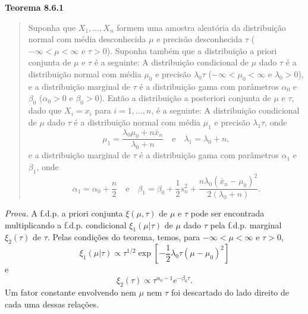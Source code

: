 \vspace{1em}
\noindent\textbf{Teorema 8.6.1}
\begin{quote}
    Suponha que $X_1, \dots, X_n$ formem uma amostra aleatória da distribuição normal com média desconhecida $\mu$ e precisão desconhecida $\tau$ ($-\infty < \mu < \infty$ e $\tau > 0$). Suponha também que a distribuição a priori conjunta de $\mu$ e $\tau$ é a seguinte: A distribuição condicional de $\mu$ dado $\tau$ é a distribuição normal com média $\mu_0$ e precisão $\lambda_0\tau$ ($-\infty < \mu_0 < \infty$ e $\lambda_0 > 0$), e a distribuição marginal de $\tau$ é a distribuição gama com parâmetros $\alpha_0$ e $\beta_0$ ($\alpha_0 > 0$ e $\beta_0 > 0$). Então a distribuição a posteriori conjunta de $\mu$ e $\tau$, dado que $X_i = x_i$ para $i=1, \dots, n$, é a seguinte: A distribuição condicional de $\mu$ dado $\tau$ é a distribuição normal com média $\mu_1$ e precisão $\lambda_1\tau$, onde
    \begin{equation} \label{eq:8.6.1}
        \mu_1 = \frac{\lambda_0\mu_0 + n\bar{x}_n}{\lambda_0 + n} \quad \text{e} \quad \lambda_1 = \lambda_0 + n,
    \end{equation}
    e a distribuição marginal de $\tau$ é a distribuição gama com parâmetros $\alpha_1$ e $\beta_1$, onde
    \begin{equation} \label{eq:8.6.2}
        \alpha_1 = \alpha_0 + \frac{n}{2} \quad \text{e} \quad \beta_1 = \beta_0 + \frac{1}{2}s_n^2 + \frac{n\lambda_0(\bar{x}_n - \mu_0)^2}{2(\lambda_0 + n)}.
    \end{equation}
\end{quote}
\vspace{1em}

\noindent\textit{Prova.} A f.d.p. a priori conjunta $\xi(\mu, \tau)$ de $\mu$ e $\tau$ pode ser encontrada multiplicando a f.d.p. condicional $\xi_1(\mu|\tau)$ de $\mu$ dado $\tau$ pela f.d.p. marginal $\xi_2(\tau)$ de $\tau$. Pelas condições do teorema, temos, para $-\infty < \mu < \infty$ e $\tau > 0$,
\[
\xi_1(\mu|\tau) \propto \tau^{1/2} \exp\left[-\frac{1}{2}\lambda_0\tau(\mu - \mu_0)^2\right]
\]
e
\[
\xi_2(\tau) \propto \tau^{\alpha_0-1}e^{-\beta_0\tau}.
\]
Um fator constante envolvendo nem $\mu$ nem $\tau$ foi descartado do lado direito de cada uma dessas relações.

